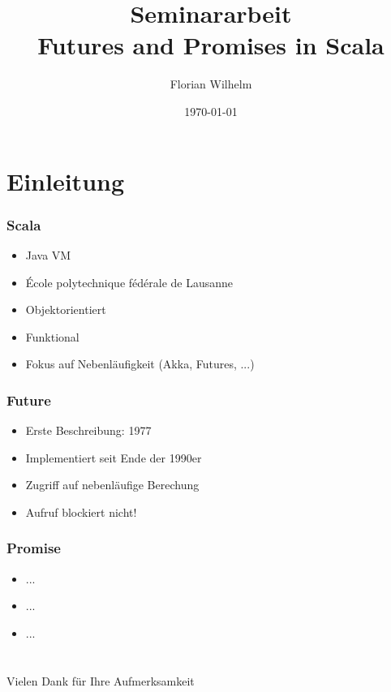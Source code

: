\documentclass{beamer}
\title[]{Seminararbeit\\Futures and Promises in Scala}
\author{Florian Wilhelm}
\date{\today{}}
\begin{document}
\frame{
\titlepage
}


\section{Einleitung}

\setcounter{subsection}{1}
\begin{frame}
  \frametitle{Scala}
  \begin{itemize}
    \item{Java VM}
    \item{École polytechnique fédérale de Lausanne}
    \item{Objektorientiert}
    \item{Funktional}
    \item{Fokus auf Nebenläufigkeit (Akka, Futures, ...)}
   \end{itemize}
\end{frame}

\setcounter{subsection}{1}
\begin{frame}
  \frametitle{Future}
   \begin{itemize}
    \item{Erste Beschreibung: 1977}
    \item{Implementiert seit Ende der 1990er}
    \item{Zugriff auf nebenläufige Berechung}
    \item{Aufruf blockiert nicht!}
   \end{itemize}
\end{frame}

\setcounter{subsection}{1}
\begin{frame}
  \frametitle{Promise}
   \begin{itemize}
    \item{...}
    \item{...}
    \item{...}
   \end{itemize}
\end{frame}

\section{}
\begin{frame}
  Vielen Dank für Ihre Aufmerksamkeit
\end{frame}
\end{document}
